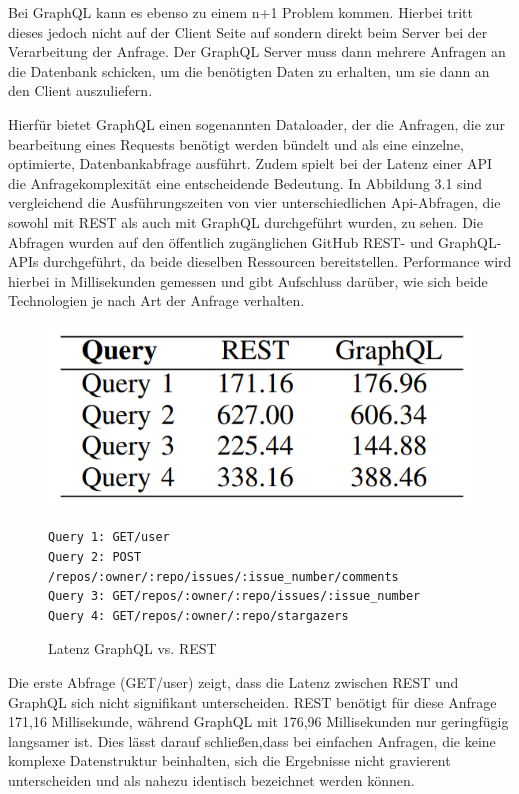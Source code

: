 \noindent
Bei GraphQL kann es ebenso zu einem n+1 Problem kommen. Hierbei tritt dieses jedoch nicht auf der Client Seite auf sondern direkt beim Server bei der Verarbeitung der Anfrage. Der GraphQL Server muss dann mehrere Anfragen an die Datenbank schicken, um die benötigten Daten zu erhalten, um sie dann an den Client auszuliefern.
\citep{graphqlsemantics}

\noindent
Hierfür bietet GraphQL einen sogenannten Dataloader, der die Anfragen, die zur bearbeitung eines Requests benötigt werden bündelt und als eine einzelne, optimierte, Datenbankabfrage ausführt. \citep{nordstrom2022graphql}
\newline
\noindent
Zudem spielt bei der Latenz einer API die Anfragekomplexität eine entscheidende Bedeutung. In Abbildung 3.1 sind vergleichend die Ausführungszeiten von vier unterschiedlichen Api-Abfragen, die sowohl mit REST als auch mit GraphQL durchgeführt wurden, zu sehen. Die Abfragen wurden auf den öffentlich zugänglichen GitHub REST- und GraphQL-APIs durchgeführt, da beide dieselben Ressourcen bereitstellen. Performance wird hierbei in Millisekunden gemessen und gibt Aufschluss darüber, wie sich beide Technologien je nach Art der Anfrage verhalten. 
\begin{figure}[H]
	\centering
	\includegraphics[scale=.5]{Illustrations/cangraphqlreplacerest.png}
\begin{BVerbatim}
Query 1: GET/user
Query 2: POST /repos/:owner/:repo/issues/:issue_number/comments
Query 3: GET/repos/:owner/:repo/issues/:issue_number
Query 4: GET/repos/:owner/:repo/stargazers
\end{BVerbatim}
	\caption{Latenz GraphQL vs. REST \citep{graphqlreplacerest}}
\end{figure}
\noindent
Die erste Abfrage (GET/user) zeigt, dass die Latenz zwischen REST und GraphQL sich nicht signifikant unterscheiden. REST benötigt für diese Anfrage 171,16 Millisekunde, während GraphQL mit 176,96 Millisekunden nur geringfügig langsamer ist. Dies lässt darauf schließen,dass bei einfachen Anfragen, die keine komplexe Datenstruktur beinhalten, sich die Ergebnisse nicht gravierent unterscheiden und als nahezu identisch bezeichnet werden können.
